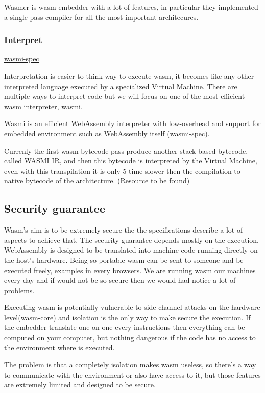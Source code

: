 \documentclass[../main.tex]{subfiles}
\begin{document}
Wasmer is wasm embedder with a lot of features, in particular they implemented a single pass compiler for all the most important architecures.

\subsubsection{Interpret}
\href{https://github.com/paritytech/Wasmi}{wasmi-spec}

Interpretation is easier to think way to execute wasm, it becomes like any other interpreted language executed by a specialized Virtual Machine. There are multiple ways to interpret code but we will focus on one of the most efficient wasm interpreter, wasmi.

Wasmi is an efficient WebAssembly interpreter with low-overhead and support for embedded environment such as WebAssembly itself (wasmi-spec).

Currenly the first wasm bytecode pass produce another stack based bytecode, called WASMI IR, and then this bytecode is interpreted by the Virtual Machine, even with this transpilation it is only 5 time slower then the compilation to native bytecode of the architecture. (Resource to be found)

\subsection{Security guarantee}

Wasm's aim is to be extremely secure the the specifications describe a lot of aspects to achieve that. The security guarantee depends mostly on the execution, WebAssembly is designed to be translated into machine code running directly on the host’s hardware. Being so portable wasm can be sent to someone and be executed freely, examples in every browsers. We are running wasm our machines every day and if would not be so secure then we would had notice a lot of problems.

Executing wasm is potentially vulnerable to side channel attacks on the hardware level(wasm-core) and isolation is the only way to make secure the execution. If the embedder translate one on one every instructions then everything can be computed on your computer, but nothing dangerous if the code has no access to the environment where is executed.

The problem is that a completely isolation makes wasm useless, so there's a way to communicate with the environment or also have access to it, but those features are extremely limited and designed to be secure.
\end{document}
